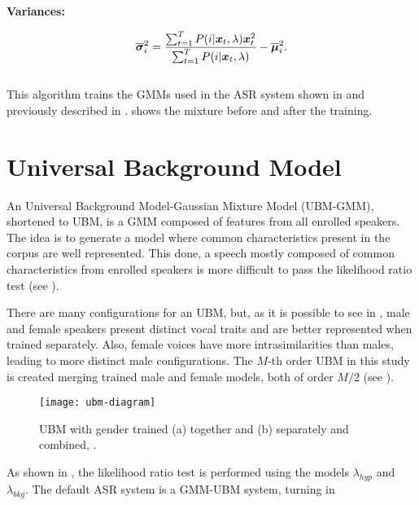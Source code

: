 \noindent\textbf{Variances:}

\begin{equation}
    \overline{\dvec{\sigma}}_i^2 = \frac{\sum_{t=1}^T \postprob{i}{\dvec{x}_t, \lambda} \dvec{x}_t^2}{\sum_{t=1}^T \postprob{i}{\dvec{x}_t, \lambda}} - \overline{\dvec{\mu}}_i^2.
    \label{eq:m-step-variances}
\end{equation}
\\

This algorithm trains the GMMs used in the ASR system shown in  and previously described in .  shows the mixture before and after the training.

\section{Universal Background Model}
\label{sec:ubm}

An Universal Background Model-Gaussian Mixture Model (UBM-GMM), shortened to UBM, is a GMM composed of features from all enrolled speakers. The idea is to generate a model where common characteristics present in the corpus are well represented. This done, a speech mostly composed of common characteristics from enrolled speakers is more difficult to pass the likelihood ratio test (see ).

There are many configurations for an UBM, but, as it is possible to see in , male and female speakers present distinct vocal traits and are better represented when trained separately. Also, female voices have more intrasimilarities than males, leading to more distinct male configurations. The $M$-th order UBM in this study is created merging trained male and female models, both of order $M/2$ (see ).

\begin{figure}[ht]
    \centering
    \texttt{[image: ubm-diagram]}
    \caption{UBM with gender trained (a) together and (b) separately and combined, .}
    \label{fig:ubm-diagram}
\end{figure}

As shown in , the likelihood ratio test is performed using the models $\lambda_{hyp}$ and $\lambda_{bkg}$. The default ASR system is a GMM-UBM system, turning  in

